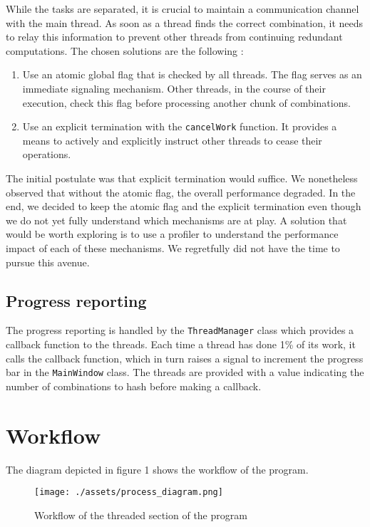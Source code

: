 \documentclass{article}
\begin{document}
While the tasks are separated, it is crucial to maintain a communication channel with the main thread. As soon as a
thread
finds the correct combination, it needs to relay this information to prevent other threads from continuing redundant
computations. The chosen solutions are the following :

\begin{enumerate}
    \item Use an atomic global flag that is checked by all threads. The flag serves as an immediate signaling mechanism. Other threads, in the course of their execution, check this flag before processing another chunk of combinations.
    \item Use an explicit termination with the \texttt{cancelWork} function. It provides a means to actively and explicitly instruct other threads to cease their operations.
\end{enumerate}

The initial postulate was that explicit termination would suffice. We nonetheless observed that without the atomic
flag, the
overall performance degraded. In the end, we decided to keep the atomic flag and the explicit termination even
though we do not yet fully understand which mechanisms are at play. A solution that would be worth exploring is to use
a profiler to understand the performance impact of each of these mechanisms. We regretfully did not have the time to
pursue this avenue.

\subsection*{Progress reporting}

The progress reporting is handled by the \texttt{ThreadManager} class which provides a callback function to the threads. Each
time a thread has done 1\% of its work, it calls the callback function, which in turn raises a signal to increment the
progress bar in the \texttt{MainWindow} class. The threads are provided with a value indicating the number of combinations to
hash before making a callback.

\section{Workflow}

The diagram depicted in figure 1 shows the workflow of the program.

\begin{figure}[!htb]
    \centering
    \texttt{[image: ./assets/process\_diagram.png]}
    \caption{Workflow of the threaded section of the program}
\end{figure}
\end{document}
